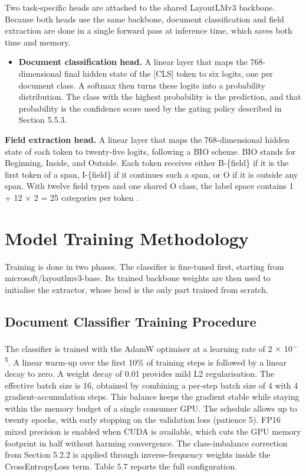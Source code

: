 Two task-specific heads are attached to the shared LayoutLMv3 backbone. Because both heads use the same backbone, document classification and field extraction are done in a single forward pass at inference time, which saves both time and memory.

\begin{itemize}
  \item \textbf{Document classification head.} A linear layer that maps the 768-dimensional final hidden state of the [CLS] token to six logits, one per document class. A softmax then turns these logits into a probability distribution. The class with the highest probability is the prediction, and that probability is the confidence score used by the gating policy described in Section 5.5.3.
\end{itemize}

\textbf{Field extraction head.} A linear layer that maps the 768-dimensional hidden state of each token to twenty-five logits, following a BIO scheme. BIO stands for Beginning, Inside, and Outside. Each token receives either B-\{field\} if it is the first token of a span, I-\{field\} if it continues such a span, or O if it is outside any span. With twelve field types and one shared O class, the label space contains 1 + 12 $\times$ 2 = 25 categories per token .

\section{Model Training Methodology}

Training is done in two phases. The classifier is fine-tuned first, starting from microsoft/layoutlmv3-base. Its trained backbone weights are then used to initialise the extractor, whose head is the only part trained from scratch.

\subsection{Document Classifier Training Procedure}

The classifier is trained with the AdamW optimiser at a learning rate of 2 $\times$ 10\textsuperscript{$-$}\textsuperscript{5}. A linear warm-up over the first 10\% of training steps is followed by a linear decay to zero. A weight decay of 0.01 provides mild L2 regularisation. The effective batch size is 16, obtained by combining a per-step batch size of 4 with 4 gradient-accumulation steps. This balance keeps the gradient stable while staying within the memory budget of a single consumer GPU. The schedule allows up to twenty epochs, with early stopping on the validation loss (patience 5). FP16 mixed precision is enabled when CUDA is available, which cuts the GPU memory footprint in half without harming convergence. The class-imbalance correction from Section 5.2.2 is applied through inverse-frequency weights inside the CrossEntropyLoss term. Table 5.7 reports the full configuration.

